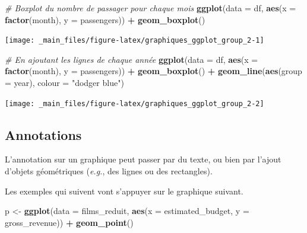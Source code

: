\documentclass[
  11pt,
]{book}
\newenvironment{Shaded}{\begin{snugshade}}{\end{snugshade}}
\newcommand{\CommentTok}[1]{\textcolor[rgb]{0.56,0.35,0.01}{\textit{#1}}}
\newcommand{\DataTypeTok}[1]{\textcolor[rgb]{0.13,0.29,0.53}{#1}}
\newcommand{\KeywordTok}[1]{\textcolor[rgb]{0.13,0.29,0.53}{\textbf{#1}}}
\newcommand{\NormalTok}[1]{#1}
\newcommand{\OperatorTok}[1]{\textcolor[rgb]{0.81,0.36,0.00}{\textbf{#1}}}
\newcommand{\StringTok}[1]{\textcolor[rgb]{0.31,0.60,0.02}{#1}}
\numberwithin{equation}{section}
\numberwithin{countremarque}{section}
\begin{document}
\begin{Shaded}
\begin{Highlighting}[]
\CommentTok{\# Boxplot du nombre de passager pour chaque mois}
\KeywordTok{ggplot}\NormalTok{(}\DataTypeTok{data =}\NormalTok{ df, }\KeywordTok{aes}\NormalTok{(}\DataTypeTok{x =} \KeywordTok{factor}\NormalTok{(month), }\DataTypeTok{y =}\NormalTok{ passengers)) }\OperatorTok{+}\StringTok{ }\KeywordTok{geom\_boxplot}\NormalTok{()}
\end{Highlighting}
\end{Shaded}

\begin{center}\texttt{[image: \_main\_files/figure-latex/graphiques\_ggplot\_group\_2-1]} \end{center}

\begin{Shaded}
\begin{Highlighting}[]
\CommentTok{\# En ajoutant les lignes de chaque année}
\KeywordTok{ggplot}\NormalTok{(}\DataTypeTok{data =}\NormalTok{ df, }\KeywordTok{aes}\NormalTok{(}\DataTypeTok{x =} \KeywordTok{factor}\NormalTok{(month), }\DataTypeTok{y =}\NormalTok{ passengers)) }\OperatorTok{+}
\StringTok{  }\KeywordTok{geom\_boxplot}\NormalTok{() }\OperatorTok{+}
\StringTok{  }\KeywordTok{geom\_line}\NormalTok{(}\KeywordTok{aes}\NormalTok{(}\DataTypeTok{group =}\NormalTok{ year), }\DataTypeTok{colour =} \StringTok{"dodger blue"}\NormalTok{)}
\end{Highlighting}
\end{Shaded}

\begin{center}\texttt{[image: \_main\_files/figure-latex/graphiques\_ggplot\_group\_2-2]} \end{center}

\hypertarget{graphiques_ggplot_annotations}{%
\subsection{Annotations}\label{graphiques_ggplot_annotations}}

L'annotation sur un graphique peut passer par du texte, ou bien par l'ajout d'objets géométriques (\emph{e.g.}, des lignes ou des rectangles).

Les exemples qui suivent vont s'appuyer sur le graphique suivant.

\begin{Shaded}
\begin{Highlighting}[]
\NormalTok{p \textless{}{-}}\StringTok{ }\KeywordTok{ggplot}\NormalTok{(}\DataTypeTok{data =}\NormalTok{ films\_reduit,}
            \KeywordTok{aes}\NormalTok{(}\DataTypeTok{x =}\NormalTok{ estimated\_budget, }\DataTypeTok{y =}\NormalTok{ gross\_revenue)) }\OperatorTok{+}
\StringTok{  }\KeywordTok{geom\_point}\NormalTok{()}
\end{Highlighting}
\end{Shaded}
\end{document}
